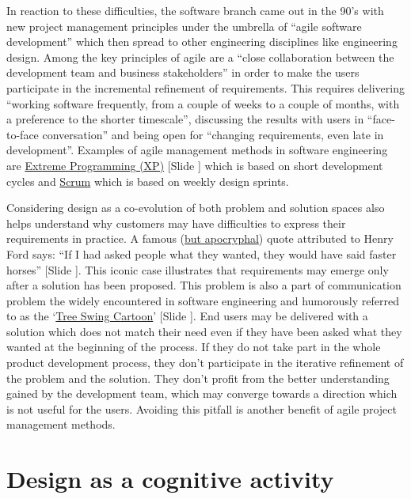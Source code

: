 \documentclass{article}
\newcounter{slide}
\begin{document}
In reaction to these difficulties, the software branch came out in the 90's with new project management principles under the umbrella of ``agile software development'' \cite{beck2001manifesto} which then spread to other engineering disciplines like engineering design. Among the key principles of agile are a ``close collaboration between the development team and business stakeholders'' in order to make the users participate in the incremental refinement of requirements. This requires delivering ``working software frequently, from a couple of weeks to a couple of months, with a preference to the shorter timescale'', discussing the results with users in ``face-to-face conversation'' and being open for ``changing requirements, even late in development''. Examples of agile management methods in software engineering are \href{https://en.wikipedia.org/wiki/Extreme_programming}{Extreme Programming (XP)} {\color{blue}[Slide ]} which is based on short development cycles and \href{https://en.wikipedia.org/wiki/Scrum_(software_development)}{Scrum} which is based on weekly design sprints.

Considering design as a co-evolution of both problem and solution spaces also helps understand why customers may have difficulties to express their requirements in practice. A famous (\href{https://quoteinvestigator.com/2011/07/28/ford-faster-horse/}{but apocryphal}) quote attributed to Henry Ford says: ``If I had asked people what they wanted, they would have said faster horses'' {\color{blue}[Slide ]}. This iconic case illustrates that requirements may emerge only after a solution has been proposed. This problem is also a part of communication problem the widely encountered in software engineering and humorously referred to as the `\href{https://en.wikipedia.org/wiki/Tree_swing_cartoon}{Tree Swing Cartoon}' {\color{blue}[Slide ]}. End users may be delivered with a solution which does not match their need even if they have been asked what they wanted at the beginning of the process. If they do not take part in the whole product development process, they don't participate in the iterative refinement of the problem and the solution. They don't profit from the better understanding gained by the development team, which may converge towards a direction which is not useful for the users. Avoiding this pitfall is another benefit of agile project management methods. 

\section{Design as a cognitive activity}
\label{sec:cognitive}





\end{document}
